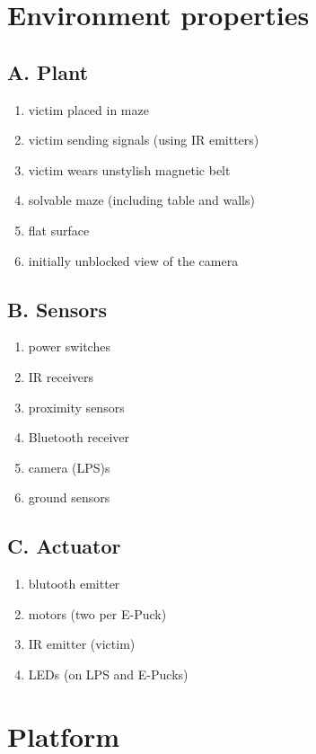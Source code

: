 \documentclass[a4paper,parskip,headheight=38pt]{scrartcl} %
\begin{document}
\section{Environment properties}

\subsection*{A. Plant}
\begin{enumerate}[label=\plant]
\item victim placed in maze
\item victim sending signals (using IR emitters)
\item victim wears unstylish magnetic belt
\item solvable maze (including table and walls)
\item flat surface
\item initially unblocked view of the camera
\end{enumerate}

\subsection*{B. Sensors}
\begin{enumerate}[label=\sensors]
\item power switches
\item IR receivers
\item proximity sensors
\item Bluetooth receiver
\item camera (LPS)s
\item ground sensors
\end{enumerate}

\subsection*{C. Actuator}
\begin{enumerate}[label=\actuators]
\item blutooth emitter
\item motors (two per E-Puck)
\item IR emitter (victim)
\item LEDs (on LPS and E-Pucks)
\end{enumerate}


\section{Platform}
\end{document}
